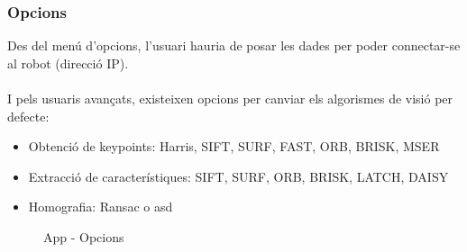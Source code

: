	\subsubsection{Opcions}
		Des del menú d'opcions, l'usuari hauria de posar les dades per poder connectar-se al robot (direcció IP).\\\\
		I pels usuaris avançats, existeixen opcions per canviar els algorismes de visió per defecte:\\
		\begin{itemize}
			\item{Obtenció de keypoints: Harris, SIFT, SURF, FAST, ORB, BRISK, MSER}
			\item{Extracció de característiques: SIFT, SURF, ORB, BRISK, LATCH, DAISY}
			\item{Homografia: Ransac o asd}
		\end{itemize}
		\begin{figure}[H]
			\begin{minipage}{6in}
				\centering
				\hspace*{.2in}
			\end{minipage}
			\caption{App - Opcions}
		\end{figure}
